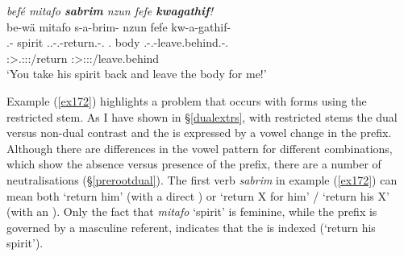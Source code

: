 \begin{exe}
	\ex \emph{befé mitafo \textbf{sabrim} nzun fefe \textbf{kwagathif}!}\\
	\glll be-wä mitafo s-a-brim-\Zero{} nzun fefe kw-a-gathif-\Zero{}\\
	\Ssg.\Erg-\Emph{} spirit \Tsg.\Masc.\Bet{}-\Vc.\Ndu-return.\Rs-\Ssg.\Imp{} \Fsg.\Dat{} body \Fsg.\Bet-\Vc.\Ndu-leave.behind.\Rs-\Ssg.\Imp{}\\
	{} {} \footnotesize{\Ssg:\Sbj>\Tsg.\Masc:\Io:\Imp:\Pfv/return} {} {} \footnotesize{\Ssg:\Sbj>\Fsg:\Io:\Imp:\Pfv/leave.behind}\\
	\trans `You take his spirit back and leave the body for me!'
	\label{ex172}
\end{exe}

Example (\ref{ex172}) highlights a problem that occurs with  forms using the restricted stem. As I have shown in \S{}\ref{dualextrs}, with restricted stems the dual versus non-dual contrast and the  is expressed by a vowel change in the prefix. Although there are differences in the vowel pattern for different  combinations, which show the absence versus presence of the  prefix, there are a number of neutralisations (\S{}\ref{prerootdual}). The first verb \emph{sabrim} in example (\ref{ex172}) can mean both `return him' (with a direct ) or `return X for him' / `return his X' (with an ). Only the fact that \emph{mitafo} `spirit' is feminine, while the prefix is governed by a masculine referent, indicates that the  is indexed (`return his spirit').\\

